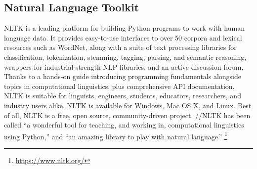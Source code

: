 \documentclass[a4paper, 12pt]{article}
\begin{document}
\begin{multicols}{2}
	\subsection{Natural Language Toolkit}
	NLTK is a leading platform for building Python programs to work with human language data. It provides easy-to-use interfaces to over 50 corpora and lexical resources such as WordNet, along with a suite of text processing libraries for classification, tokenization, stemming, tagging, parsing, and semantic reasoning, wrappers for industrial-strength NLP libraries, and an active discussion forum. \\ Thanks to a hands-on guide introducing programming fundamentals alongside topics in computational linguistics, plus comprehensive API documentation, NLTK is suitable for linguists, engineers, students, educators, researchers, and industry users alike. NLTK is available for Windows, Mac OS X, and Linux. Best of all, NLTK is a free, open source, community-driven project. //NLTK has been called “a wonderful tool for teaching, and working in, computational linguistics using Python,” and “an amazing library to play with natural language.” \footnote{\url{https://www.nltk.org/}}

\end{multicols}
\end{document}

